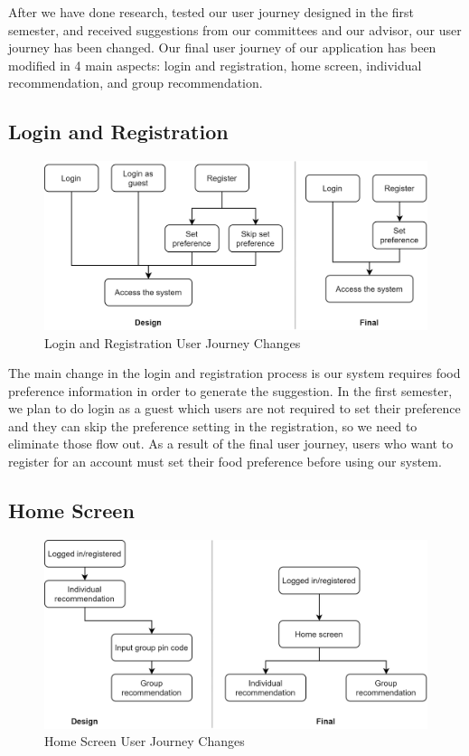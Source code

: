 \documentclass[12pt,oneside,openright,a4paper]{cpe-english-project}
\begin{document}
After we have done research, tested our user journey designed in the first semester, and received suggestions from our committees and our advisor, our user journey has been changed. Our final user journey of our application has been modified in 4 main aspects: login and registration, home screen, individual recommendation, and group recommendation.


\subsection{Login and Registration}

\begin{figure}[H]\centering
\includegraphics[width=350pt]{./images/4LoginandRegistrationUserJourneyChanges.png}
\caption{Login and Registration User Journey Changes}\label{fig:4LoginandRegistrationUserJourneyChanges}
\end{figure}

The main change in the login and registration process is our system requires food preference information in order to generate the suggestion. In the first semester, we plan to do login as a guest which users are not required to set their preference and they can skip the preference setting in the registration, so we need to eliminate those flow out. As a result of the final user journey, users who want to register for an account must set their food preference before using our system.

\subsection{Home Screen}

\begin{figure}[H]\centering
\includegraphics[width=350pt]{./images/4HomeScreenUserJourneyChanges.png}
\caption{Home Screen User Journey Changes}\label{fig:4HomeScreenUserJourneyChanges}
\end{figure}
\end{document}
